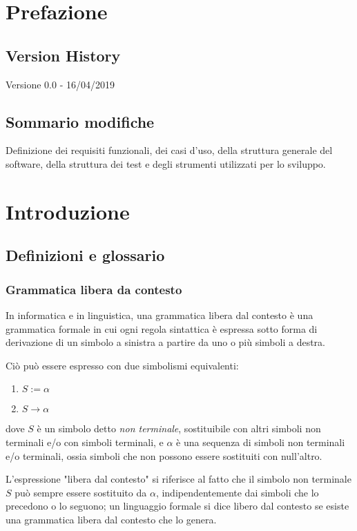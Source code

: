 \documentclass[12pt]{article}
\begin{document}
\tableofcontents

\pagebreak

\section{Prefazione}

\subsection{Version History}

Versione 0.0 - 16/04/2019

\subsection{Sommario modifiche}
Definizione dei requisiti funzionali, dei casi d'uso, della struttura generale del software, della struttura dei test e degli strumenti utilizzati per lo sviluppo.

\pagebreak

\section{Introduzione}

\subsection{Definizioni e glossario}
\subsubsection*{Grammatica libera da contesto}
In informatica e in linguistica, una grammatica libera dal contesto è una grammatica formale in cui
ogni regola sintattica è espressa sotto forma di derivazione di un simbolo a sinistra a partire da uno
o più simboli a destra. \par
Ciò può essere espresso con due simbolismi equivalenti:
\begin{enumerate}[label=\arabic*)]
\item $S := \alpha$
\item $S \to \alpha$
\end{enumerate}
dove $S$ è un simbolo detto \textit{non terminale}, sostituibile con altri simboli non terminali e/o con simboli terminali, e $\alpha$ è una sequenza di simboli non terminali e/o terminali, ossia simboli che non possono essere sostituiti con null'altro. \par
L'espressione "libera dal contesto" si riferisce al fatto che il simbolo non terminale $S$ può sempre
essere sostituito da $\alpha$, indipendentemente dai simboli che lo precedono o lo seguono; un linguaggio
formale si dice libero dal contesto se esiste una grammatica libera dal contesto che lo genera.
\end{document}
